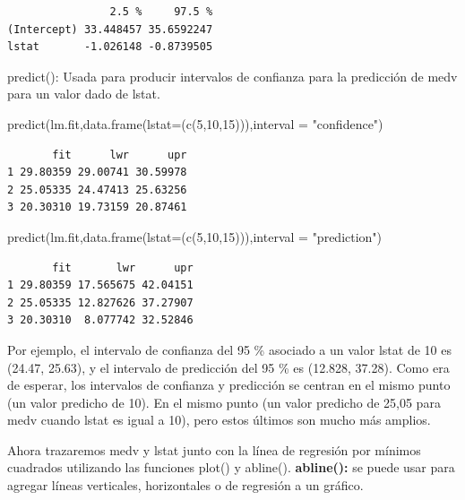 \documentclass[
  letterpaper,
  DIV=11,
  numbers=noendperiod]{scrartcl}
\newenvironment{Shaded}{\begin{snugshade}}{\end{snugshade}}
\newcommand{\AttributeTok}[1]{\textcolor[rgb]{0.40,0.45,0.13}{#1}}
\newcommand{\DecValTok}[1]{\textcolor[rgb]{0.68,0.00,0.00}{#1}}
\newcommand{\FunctionTok}[1]{\textcolor[rgb]{0.28,0.35,0.67}{#1}}
\newcommand{\NormalTok}[1]{\textcolor[rgb]{0.00,0.23,0.31}{#1}}
\newcommand{\StringTok}[1]{\textcolor[rgb]{0.13,0.47,0.30}{#1}}
\begin{document}
\begin{verbatim}
                2.5 %     97.5 %
(Intercept) 33.448457 35.6592247
lstat       -1.026148 -0.8739505
\end{verbatim}

predict(): Usada para producir intervalos de confianza para la
predicción de medv para un valor dado de lstat.

\begin{Shaded}
\begin{Highlighting}[]
\FunctionTok{predict}\NormalTok{(lm.fit,}\FunctionTok{data.frame}\NormalTok{(}\AttributeTok{lstat=}\NormalTok{(}\FunctionTok{c}\NormalTok{(}\DecValTok{5}\NormalTok{,}\DecValTok{10}\NormalTok{,}\DecValTok{15}\NormalTok{))),}\AttributeTok{interval =} \StringTok{"confidence"}\NormalTok{)}
\end{Highlighting}
\end{Shaded}

\begin{verbatim}
       fit      lwr      upr
1 29.80359 29.00741 30.59978
2 25.05335 24.47413 25.63256
3 20.30310 19.73159 20.87461
\end{verbatim}

\begin{Shaded}
\begin{Highlighting}[]
\FunctionTok{predict}\NormalTok{(lm.fit,}\FunctionTok{data.frame}\NormalTok{(}\AttributeTok{lstat=}\NormalTok{(}\FunctionTok{c}\NormalTok{(}\DecValTok{5}\NormalTok{,}\DecValTok{10}\NormalTok{,}\DecValTok{15}\NormalTok{))),}\AttributeTok{interval =} \StringTok{"prediction"}\NormalTok{)}
\end{Highlighting}
\end{Shaded}

\begin{verbatim}
       fit       lwr      upr
1 29.80359 17.565675 42.04151
2 25.05335 12.827626 37.27907
3 20.30310  8.077742 32.52846
\end{verbatim}

Por ejemplo, el intervalo de confianza del 95 \% asociado a un valor
lstat de 10 es (24.47, 25.63), y el intervalo de predicción del 95 \% es
(12.828, 37.28). Como era de esperar, los intervalos de confianza y
predicción se centran en el mismo punto (un valor predicho de 10). En el
mismo punto (un valor predicho de 25,05 para medv cuando lstat es igual
a 10), pero estos últimos son mucho más amplios.

Ahora trazaremos medv y lstat junto con la línea de regresión por
mínimos cuadrados utilizando las funciones plot() y abline().
\textbf{abline():} se puede usar para agregar líneas verticales,
horizontales o de regresión a un gráfico.
\end{document}

